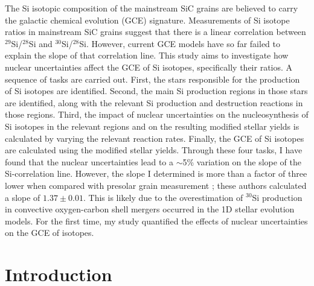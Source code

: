 \documentclass{brandeis-thesis3.2}
\newcommand{\iso}[2]{$^{#1}${#2}}
\begin{document}
\clearpage

\begin{thesis-abstract}
 The Si isotopic composition of the mainstream SiC grains are believed to carry the galactic chemical evolution (GCE) signature. Measurements of Si isotope ratios in mainstream SiC grains suggest that there is a linear correlation between \iso{29}{Si}/\iso{28}{Si} and \iso{30}{Si}/\iso{28}{Si}. However, current GCE models have so far failed to explain the slope of that correlation line. This study aims to investigate how nuclear uncertainties affect the GCE of Si isotopes, specifically their ratios. A sequence of tasks are carried out. First, the stars responsible for the production of Si isotopes are identified. Second, the main Si production regions in those stars are identified, along with the relevant Si production and destruction reactions in those regions. Third, the impact of nuclear uncertainties on the nucleosynthesis of Si isotopes in the relevant regions and on the resulting modified stellar yields is calculated by varying the relevant reaction rates. Finally, the GCE of Si isotopes are calculated using the modified stellar yields. Through these four tasks, I have found that the nuclear uncertainties lead to a $\sim$5\% variation on the slope of the Si-correlation line. However, the slope I determined is more than a factor of three lower when compared with presolar grain measurement \citep{Zinner2007}; these authors calculated a slope of $1.37\pm 0.01$. This is likely due to the overestimation of \iso{30}{Si} production in convective oxygen-carbon shell mergers occurred in the 1D stellar evolution models. For the first time, my study quantified the effects of nuclear uncertainties on the GCE of isotopes.

\end{thesis-abstract}

\clearpage

\tableofcontents
\clearpage



\startbody


\chapter{Introduction}
\end{document}
